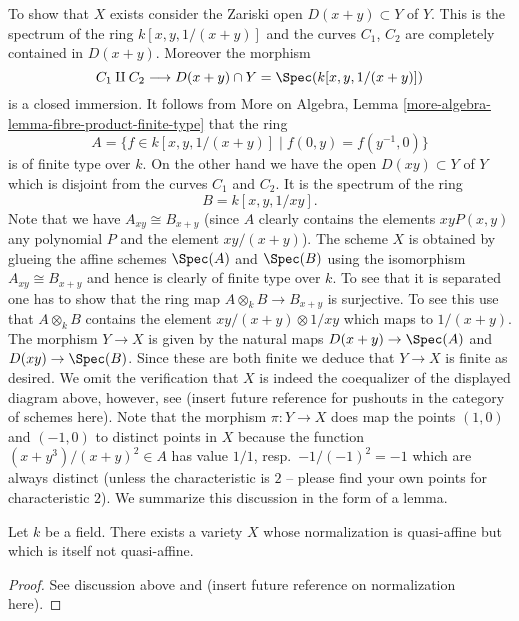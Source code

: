 \medskip\noindent
To show that $X$ exists consider the Zariski open
$D(x + y) \subset Y$ of $Y$. This is the spectrum
of the ring
$k[x, y, 1/(x + y)]$
and the curves $C_1$, $C_2$ are completely contained in
$D(x + y)$. Moreover the morphism
$$
C_1 \amalg C_2
\longrightarrow
D(x + y) \cap Y = \Spec(k[x, y, 1/(x + y)])
$$
is a closed immersion. It follows from
More on Algebra, Lemma \ref{more-algebra-lemma-fibre-product-finite-type}
that the ring
$$
A =
\{f \in k[x, y, 1/(x + y)] \mid f(0, y) = f(y^{-1}, 0)\}
$$
is of finite type over $k$. On the other hand we have the open
$D(xy) \subset Y$ of $Y$ which is disjoint from the curves $C_1$
and $C_2$. It is the spectrum of the ring
$$
B = k[x, y, 1/xy].
$$
Note that we have $A_{xy} \cong B_{x + y}$ (since $A$ clearly contains
the elements $xyP(x, y)$ any polynomial $P$ and the element $xy/(x + y)$).
The scheme $X$ is obtained by glueing the affine schemes
$\Spec(A)$ and $\Spec(B)$ using the isomorphism
$A_{xy} \cong B_{x + y}$ and hence is clearly of finite type over
$k$. To see that it is separated one has to show that the
ring map $A \otimes_k B \to B_{x + y}$ is surjective. To see
this use that $A \otimes_k B$ contains the element
$xy/(x + y) \otimes 1/xy$ which maps to $1/(x + y)$.
The morphism $Y \to X$ is given by the natural maps
$D(x + y) \to \Spec(A)$ and $D(xy) \to \Spec(B)$.
Since these are both finite we deduce that $Y \to X$ is finite
as desired. We omit the verification that $X$ is indeed the
coequalizer of the displayed diagram above, however, see
(insert future reference for pushouts in the category of schemes
here). Note that the morphism $\pi : Y \to X$ does
map the points  $(1, 0)$
and $(-1, 0)$ to distinct points in $X$ because the
function $(x + y^3)/(x + y)^2 \in A$ has value
$1/1$, resp.\ $-1/(-1)^2 = -1$ which are always distinct
(unless the characteristic is $2$ -- please find your own points
for characteristic $2$). We summarize this discussion in the
form of a lemma.

\begin{lemma}
\label{lemma-quasi-affine-normalization-not-quasi-affine}
Let $k$ be a field.
There exists a variety $X$ whose normalization is quasi-affine but
which is itself not quasi-affine.
\end{lemma}

\begin{proof}
See discussion above and (insert future reference on normalization here).
\end{proof}



